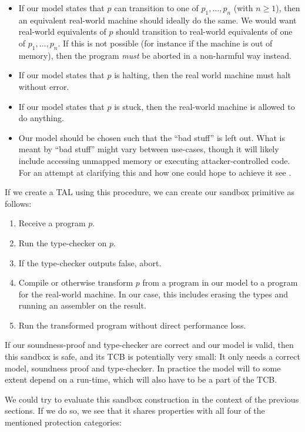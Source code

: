 \begin{itemize}
\item If our model states that $p$ can transition to one of $p_1, \dots, p_n$
  (with $n \geq 1$), then an equivalent real-world machine should ideally do the
  same. We would want real-world equivalents of $p$ should transition to
  real-world equivalents of one of $p_1, \dots, p_n$. If this is not possible
  (for instance if the machine is out of memory), then the program \emph{must}
  be aborted in a non-harmful way instead.
\item If our model states that $p$ is halting, then the real world machine
  must halt without error.
\item If our model states that $p$ is stuck, then the real-world machine is
  allowed to do anything.
\item Our model should be chosen such that the ``bad stuff'' is left out. What
  is meant by ``bad stuff'' might vary between use-cases, though it will likely
  include accessing unmapped memory or executing attacker-controlled code. For
  an attempt at clarifying this and how one could hope to achieve it see
  .
\end{itemize}

If we create a TAL using this procedure, we can create our sandbox primitive as
follows:

\begin{enumerate}
\item Receive a program $p$.
\item Run the type-checker on $p$.
\item If the type-checker outputs false, abort.
\item Compile or otherwise transform $p$ from a program in our model to a
  program for the real-world machine. In our case, this includes erasing the
  types and running an assembler on the result.
\item Run the transformed program without direct performance loss.
\end{enumerate}

If our soundness-proof and type-checker are correct and our model is valid, then
this sandbox is safe, and its TCB is potentially very small: It only needs a
correct model, soundness proof and type-checker. In practice the model will to
some extent depend on a run-time, which will also have to be a part of the TCB.

We could try to evaluate this sandbox construction in the context of the
previous sections. If we do so, we see that it shares properties with all four
of the mentioned protection categories:

